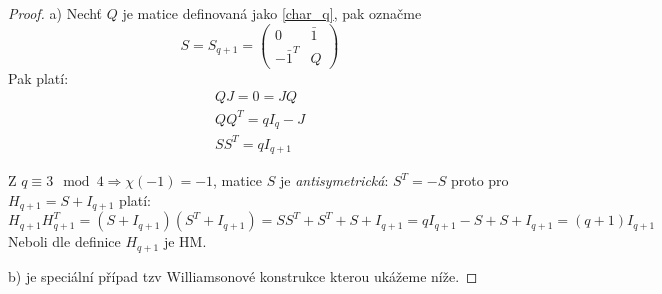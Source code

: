 \begin{theorem}
\end{theorem}
\begin{proof}
	a) Nechť $Q$ je matice definovaná jako \cref{char_q}, pak označme
	\begin{equation}\label{will_s}
		S = S_{q + 1} = \begin{pmatrix} 0 & \bar{1} \\ -\bar{1}^T & Q \end{pmatrix}
	\end{equation}
	Pak platí:
	\begin{gather*}
		QJ = 0 = JQ \\
		QQ^T = qI_q - J \\
		SS^T = q I_{q + 1}
	\end{gather*}

	Z $q \equiv 3 \mod 4 \Rightarrow \chi(-1) = -1$, matice $S$ je \emph{antisymetrická}: $S^T = -S$ proto pro $H_{q + 1} = S + I_{q + 1}$ platí:
	\[ H_{q + 1} H_{q + 1}^T = (S + I_{q + 1})(S^T + I_{q + 1}) = SS^T + S^T + S + I_{q + 1} = qI_{q + 1} - S + S + I_{q + 1} = (q + 1) I_{q + 1} \]
	Neboli dle definice $H_{q + 1}$ je HM.

	b) je speciální případ tzv Williamsonové konstrukce kterou ukážeme níže.
\end{proof}

